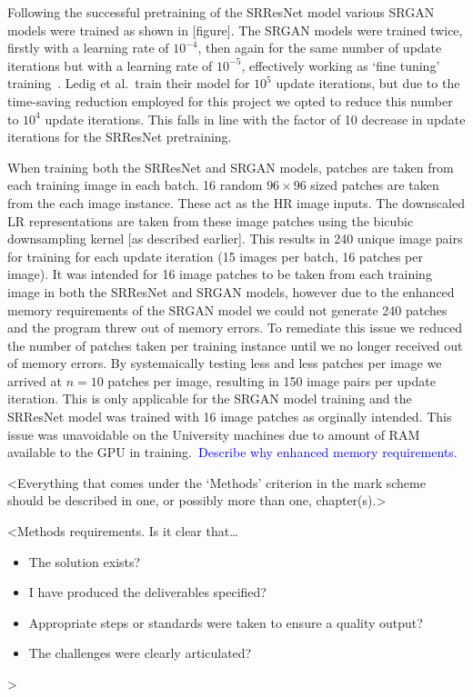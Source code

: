 Following the successful pretraining of the SRResNet model various SRGAN models were trained as shown in [figure]. The SRGAN models were trained twice, firstly with a learning rate of $10^{-4}$, then again for the same number of update iterations but with a learning rate of $10^{-5}$, effectively working as `fine tuning' training~\cite{srgan}. Ledig et al.\ train their model for $10^5$ update iterations, but due to the time-saving reduction employed for this project we opted to reduce this number to $10^4$ update iterations. This falls in line with the factor of 10 decrease in update iterations for the SRResNet pretraining.

When training both the SRResNet and SRGAN models, patches are taken from each training image in each batch. 16 random $96 \times 96$ sized patches are taken from the each image instance. These act as the HR image inputs. The downscaled LR representations are taken from these image patches using the bicubic downsampling kernel [as described earlier]. This results in 240 unique image pairs for training for each update iteration (15 images per batch, 16 patches per image). It was intended for 16 image patches to be taken from each training image in both the SRResNet and SRGAN models, however due to the enhanced memory requirements of the SRGAN model we could not generate 240 patches and the program threw out of memory errors. To remediate this issue we reduced the number of patches taken per training instance until we no longer received out of memory errors. By systemaically testing less and less patches per image we arrived at $n=10$ patches per image, resulting in 150 image pairs per update iteration. This is only applicable for the SRGAN model training and the SRResNet model was trained with 16 image patches as orginally intended. This issue was unavoidable on the University machines due to amount of RAM available to the GPU in training.\ \textcolor{blue}{Describe why enhanced memory requirements.} 
 
<Everything that comes under the `Methods' criterion in the mark scheme should be described in one, or possibly more than one, chapter(s).>

<Methods requirements. Is it clear that\dots
\begin{itemize}
    \item The solution exists?
    \item I have produced the deliverables specified?
    \item Appropriate steps or standards were taken to ensure a quality output?
    \item The challenges were clearly articulated?
\end{itemize}
>
